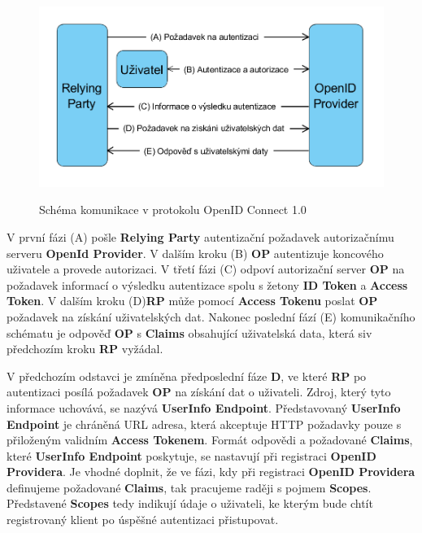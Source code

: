 \documentclass[
  printed, %
  twoside, %
  table,   %
  nolof,     %
  nolot,     %
]{fithesis3}
\begin{document}
\begin{figure}[H]
\caption{Schéma komunikace v protokolu OpenID Connect 1.0}
\centering
\includegraphics[width=12.8cm]{pics/diplomkaOIDC} 
\label{fig:oidc}
\end{figure}
\par 

V první fázi (A) pošle \textbf{Relying Party} autentizační požadavek autorizačnímu serveru \textbf{OpenId Provider}. V dalším kroku (B) \textbf{OP} autentizuje koncového uživatele a provede autorizaci. V třetí fázi (C) odpoví autorizační server \textbf{OP} na požadavek informací o výsledku autentizace spolu s žetony \textbf{ID Token} a \textbf{Access Token}. V dalším kroku (D)\break \textbf{RP} může pomocí \textbf{Access Tokenu} poslat \textbf{OP} požadavek na získání uživatelských dat. Nakonec poslední fází (E) komunikačního schématu je odpověď \textbf{OP} s \textbf{Claims} obsahující uživatelská data, která si\break v předchozím kroku \textbf{RP} vyžádal. 
\par

V předchozím odstavci je zmíněna předposlední fáze \textbf{D}, ve které \textbf{RP} po autentizaci posílá požadavek \textbf{OP} na získání dat o uživateli. Zdroj, který tyto informace uchovává, se nazývá \textbf{UserInfo Endpoint}. Představovaný \textbf{UserInfo Endpoint} je chráněná URL adresa, která akceptuje HTTP požadavky pouze s přiloženým validním \textbf{Access Tokenem}. Formát odpovědi a požadované \textbf{Claims}, které \textbf{UserInfo Endpoint} poskytuje, se nastavují při registraci \textbf{OpenID Providera}. Je vhodné doplnit, že ve fázi, kdy při registraci \textbf{OpenID Providera} definujeme požadované \textbf{Claims}, tak pracujeme raději s pojmem \textbf{Scopes}. Představené \textbf{Scopes} tedy indikují údaje o uživateli, ke kterým bude chtít registrovaný klient po úspěšné autentizaci přistupovat.
\par
\end{document}
